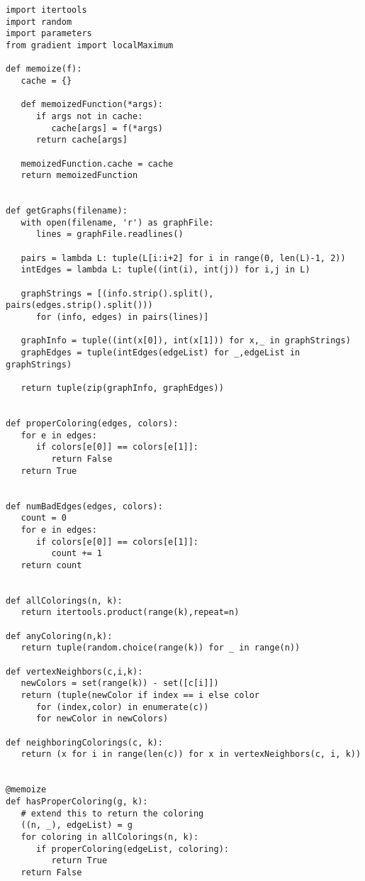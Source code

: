 \begin{lstlisting}[caption={The sourcecode for computing resilience by brute
force and heuristically-guided search.},label=listing:resilience]
import itertools
import random
import parameters
from gradient import localMaximum

def memoize(f):
   cache = {}

   def memoizedFunction(*args):
      if args not in cache:
         cache[args] = f(*args)
      return cache[args]

   memoizedFunction.cache = cache
   return memoizedFunction


def getGraphs(filename):
   with open(filename, 'r') as graphFile:
      lines = graphFile.readlines()

   pairs = lambda L: tuple(L[i:i+2] for i in range(0, len(L)-1, 2))
   intEdges = lambda L: tuple((int(i), int(j)) for i,j in L)

   graphStrings = [(info.strip().split(), pairs(edges.strip().split())) 
      for (info, edges) in pairs(lines)]

   graphInfo = tuple((int(x[0]), int(x[1])) for x,_ in graphStrings)
   graphEdges = tuple(intEdges(edgeList) for _,edgeList in graphStrings)

   return tuple(zip(graphInfo, graphEdges))


def properColoring(edges, colors):
   for e in edges:
      if colors[e[0]] == colors[e[1]]:
         return False
   return True


def numBadEdges(edges, colors):
   count = 0
   for e in edges:
      if colors[e[0]] == colors[e[1]]:
         count += 1
   return count


def allColorings(n, k):
   return itertools.product(range(k),repeat=n)

def anyColoring(n,k):
   return tuple(random.choice(range(k)) for _ in range(n))

def vertexNeighbors(c,i,k):
   newColors = set(range(k)) - set([c[i]])
   return (tuple(newColor if index == i else color 
      for (index,color) in enumerate(c))
      for newColor in newColors)

def neighboringColorings(c, k):
   return (x for i in range(len(c)) for x in vertexNeighbors(c, i, k))


@memoize
def hasProperColoring(g, k):
   # extend this to return the coloring
   ((n, _), edgeList) = g
   for coloring in allColorings(n, k):
      if properColoring(edgeList, coloring):
         return True
   return False



\end{lstlisting}
